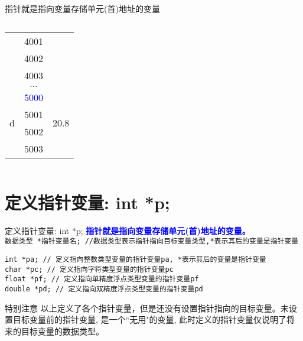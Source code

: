 \begin{frame}{指针就是指向变量存储单元(首)地址的变量}
\begin{columns}[T]
\begin{tabular}{|c|c|c|}
	& 4001 &  \\ \cline{2-2}
	& 4002 &  \\ \cline{2-2}
	& 4003 &  \\ 
	\hline 
	& $\dots$ &  \\ 
	\hline 
	\multirow{4}{*}{d} & \textcolor{blue}{5000} & \multirow{4}{*}{20.8} \\ \cline{2-2}
	& 5001 &  \\ \cline{2-2}
	& 5002 &  \\ \cline{2-2}
	& 5003 &  \\ \cline{2-2}
	\hline 
\end{tabular} 
\end{columns}
\medskip
\end{frame}

\section{定义指针变量: int *p;}

\begin{frame}{定义指针变量: int *p;}
\textbf{\textcolor{blue}{指针就是指向变量存储单元(首)地址的变量。}}\\
\medskip
\lstinline|数据类型 *指针变量名; //数据类型表示指针指向目标变量类型,*表示其后的变量是指针变量|
\begin{lstlisting}
int *pa; // 定义指向整数类型变量的指针变量pa, *表示其后的变量是指针变量
char *pc; // 定义指向字符类型变量的指针变量pc
float *pf; // 定义指向单精度浮点类型变量的指针变量pf
double *pd; // 定义指向双精度浮点类型变量的指针变量pd
\end{lstlisting}
\begin{block}{特别注意}
	以上定义了各个指针变量，但是还没有设置指针指向的目标变量。未设置目标变量前的指针变量, 是一个``无用"的变量, 此时定义的指针变量仅说明了将来的目标变量的数据类型。
\end{block}
\end{frame}

